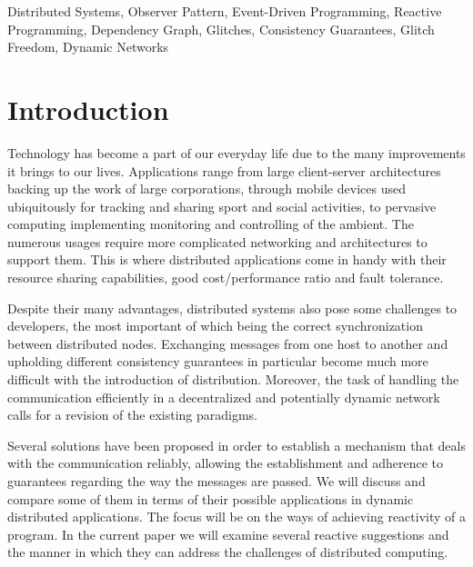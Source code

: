 \documentclass{sigplanconf}
\begin{document}


\keywords
Distributed Systems, Observer Pattern, Event-Driven Programming, Reactive Programming, Dependency Graph, Glitches, Consistency Guarantees, Glitch Freedom, Dynamic Networks

\section{Introduction}

Technology has become a part of our everyday life due to the many improvements it brings to our lives. Applications range from large client-server architectures backing up the work of large corporations, through mobile devices used ubiquitously for tracking and sharing sport and social activities, to pervasive computing implementing monitoring and controlling of the ambient. The numerous usages require more complicated networking and architectures to support them. This is where distributed applications come in handy with their resource sharing capabilities, good cost/performance ratio and fault tolerance.

Despite their many advantages, distributed systems also pose some challenges to developers, the most important of which being the correct synchronization between distributed nodes. Exchanging messages from one host to another and upholding different consistency guarantees in particular become much more difficult with the introduction of distribution. Moreover, the task of handling the communication efficiently in a decentralized and potentially dynamic network calls for a revision of the existing paradigms. 

Several solutions have been proposed in order to establish a mechanism that deals with the communication reliably, allowing the establishment and adherence to guarantees regarding the way the messages are passed. We will discuss and compare some of them in terms of their possible applications in dynamic distributed applications. The focus will be on the ways of achieving reactivity of a program. In the current paper we will examine several reactive suggestions and the manner in which they can address the challenges of distributed computing.
\end{document}
